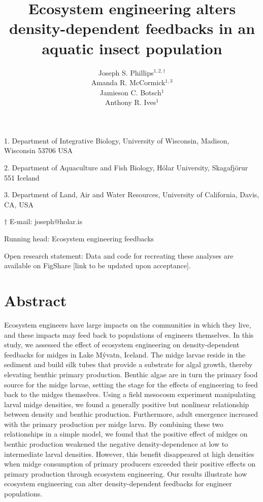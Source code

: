 \documentclass[12pt]{article}
\title{Ecosystem engineering alters density-dependent feedbacks in an aquatic insect population}
\author{
Joseph S. Phillips$^{1,2,\dagger}$ \\
Amanda R. McCormick$^{1,3}$ \\
Jamieson C. Botsch$^{1}$ \\
Anthony R. Ives$^{1}$}
\date{}
\begin{document}
\raggedright
\setlength\parindent{0.25in}

\maketitle

\noindent{} 1. Department of Integrative Biology, University of Wisconsin, Madison, Wisconsin 53706 USA

\noindent{} 2. Department of Aquaculture and Fish Biology, H\'{o}lar University, Skagafj\"{o}r{\dh}ur 551 Iceland

\noindent{} 3. Department of Land, Air and Water Resources, 
University of California, Davis, CA, USA

\noindent{} $\dagger$ E-mail: joseph@holar.is

\bigskip

Running head: {Ecosystem engineering feedbacks}

Open research statement: {Data and code for recreating these analyses are available 
on FigShare [link to be updated upon acceptance].}


\linenumbers{}

\clearpage






\section*{Abstract}

Ecosystem engineers have large impacts on the communities in which they live,
and these impacts may feed back to populations of engineers themselves.
In this study, we assessed the effect of ecosystem engineering 
on density-dependent feedbacks for midges in Lake M\'{y}vatn, Iceland. 
The midge larvae reside in the sediment and build silk tubes that provide 
a substrate for algal growth, thereby elevating benthic primary production.
Benthic algae are in turn the primary food source for the midge larvae,
setting the stage for the effects of engineering to feed back to the midges themselves.
Using a field mesocosm experiment manipulating larval midge densities,
we found a generally positive but nonlinear relationship between
density and benthic production.
Furthermore, 
adult emergence increased with the primary production per midge larva.
By combining these two relationships in a simple model,
we found that the positive effect of midges on benthic production 
weakened the negative density-dependence at low to intermediate larval densities.
However, this benefit disappeared at high densities when midge consumption 
of primary producers exceeded their positive effects 
on primary production through ecosystem engineering.
Our results illustrate how ecosystem engineering can alter 
density-dependent feedbacks for engineer populations.
\end{document}
